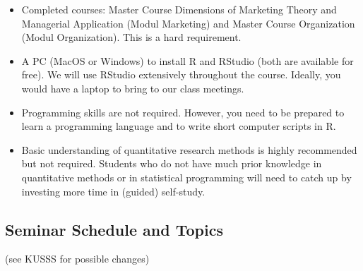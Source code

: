 \documentclass[]{article}
\begin{document}
\begin{itemize}
\item
  Completed courses: Master Course Dimensions of Marketing Theory and
  Managerial Application (Modul Marketing) and Master Course
  Organization (Modul Organization). This is a hard requirement.
\item
  A PC (MacOS or Windows) to install R and RStudio (both are available
  for free). We will use RStudio extensively throughout the course.
  Ideally, you would have a laptop to bring to our class meetings.
\item
  Programming skills are not required. However, you need to be prepared
  to learn a programming language and to write short computer scripts in
  R.
\item
  Basic understanding of quantitative research methods is highly
  recommended but not required. Students who do not have much prior
  knowledge in quantitative methods or in statistical programming will
  need to catch up by investing more time in (guided) self-study.
\end{itemize}

\subsection{Seminar Schedule and
Topics}\label{seminar-schedule-and-topics}

(see KUSSS for possible changes)
\end{document}
